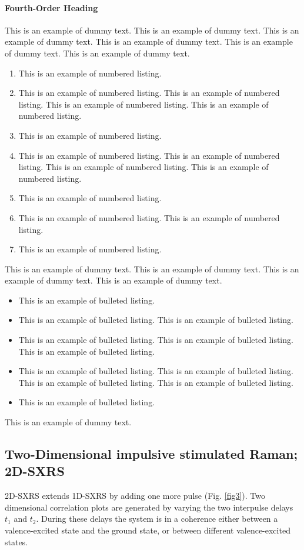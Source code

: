 \documentclass{ar-1col}
\begin{document}
\paragraph{Fourth-Order Heading}
This is an example of dummy text. This is an example of dummy text. This is an example of dummy text.
This is an example of dummy text. This is an example of dummy text. This is an example of dummy text.
\begin{enumerate}
\item This is an example of numbered listing.
\item This is an example of numbered listing. This is an example of numbered listing. This is an example of numbered listing. This is an example of numbered listing.
\item This is an example of numbered listing.
\item This is an example of numbered listing. This is an example of numbered listing. This is an example of numbered listing. This is an example of numbered listing.
\item This is an example of numbered listing.
\item This is an example of numbered listing. This is an example of numbered listing.
\item This is an example of numbered listing.
\end{enumerate}

This is an example of dummy text. This is an example of dummy text. This is an example of dummy text. This is an example of dummy text.
\begin{itemize}
\item This is an example of bulleted listing.
\item This is an example of bulleted listing. This is an example of bulleted listing.
\item This is an example of bulleted listing.  This is an example of bulleted listing. This is an example of bulleted listing.
\item This is an example of bulleted listing. This is an example of bulleted listing. This is an example of bulleted listing. This is an example of bulleted listing.
\item This is an example of bulleted listing.
\end{itemize}
This is an example of dummy text.


\subsection{Two-Dimensional impulsive stimulated Raman; 2D-SXRS}
2D-SXRS extends 1D-SXRS by adding one more pulse
(Fig. \ref{fig3}).  Two dimensional correlation plots are
generated by varying the two interpulse delays $t_1$ and $t_2$.
During these delays the system is in a coherence either between a
valence-excited state and the ground state, or between different
valence-excited states.
\end{document}
